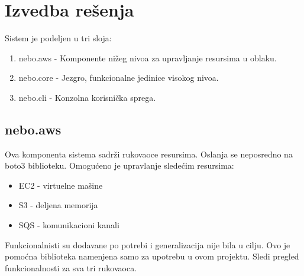 \documentclass[a4paper]{article}
\begin{document}
\newpage
\section{Izvedba rešenja}

Sistem je podeljen u tri sloja:

\begin{enumerate}
  \item nebo.aws - Komponente nižeg nivoa za upravljanje resursima u oblaku.
  \item nebo.core - Jezgro, funkcionalne jedinice visokog nivoa.
  \item nebo.cli - Konzolna korisnička sprega.
\end{enumerate}

\hspace{0.3\textwidth}

\subsection{nebo.aws}

Ova komponenta sistema sadrži rukovaoce resursima. Oslanja se neposredno na
boto3 biblioteku. Omogućeno je upravlanje sledećim resursima:

\begin{itemize}
\item EC2 - virtuelne mašine
\item S3 - deljena memorija
\item SQS - komunikacioni kanali
\end{itemize}


Funkcionalnisti su dodavane po potrebi i generalizacija nije bila u cilju. Ovo
je pomoćna biblioteka namenjena samo za upotrebu u ovom projektu. Sledi pregled
funkcionalnosti za sva tri rukovaoca.
\end{document}

